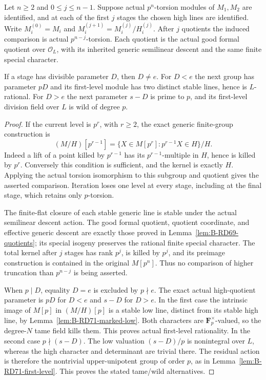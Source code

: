 \begin{lemma}
\label{lem:B-RD74-actual-levels}
Let \(n\ge2\) and \(0\le j\le n-1\). Suppose actual
\(p^n\)-torsion modules of
\(M_1,M_2\) are identified, and at each of the first \(j\)
stages the chosen high lines are identified. Write
\(M_i^{(0)}=M_i\) and
\(M_i^{(j+1)}=M_i^{(j)}/H_i^{(j)}\).
After \(j\) quotients the induced comparison is actual
\(p^{n-j}\)-torsion. Each quotient is the actual good formal
quotient over \(\mathcal O_L\), with its inherited generic
semilinear descent and the same finite special character.

If a stage has divisible parameter \(D\), then \(D\ne e\).
For \(D<e\) the next group has parameter \(pD\) and its
first-level module has two distinct stable lines, hence is
\(L\)-rational. For \(D>e\) the next parameter \(s-D\) is
prime to \(p\), and its first-level division field over \(L\)
is wild of degree \(p\).
\end{lemma}
\begin{proof}
If the current level is \(p^r\), with \(r\ge2\), the exact
generic finite-group construction is
\[
 (M/H)[p^{r-1}]
  =\{X\in M[p^r]:p^{r-1}X\in H\}/H.
 \tag{B-RD74.3}
\]
Indeed a lift of a point killed by \(p^{r-1}\) has its
\(p^{r-1}\)-multiple in \(H\), hence is killed by \(p^r\).
Conversely this condition is sufficient, and the kernel is
exactly \(H\). Applying the actual torsion isomorphism to this
subgroup and quotient gives the asserted comparison. Iteration
loses one level at every stage, including at the final stage,
which retains only \(p\)-torsion.

The finite-flat closure of each stable generic line is stable
under the actual semilinear descent action. The good formal
quotient, quotient coordinate, and effective generic descent
are exactly those proved in
Lemma~\ref{lem:B-RD69-quotients}; its special isogeny preserves
the rational finite special character. The total kernel after
\(j\) stages has rank \(p^j\), is killed by \(p^j\), and its
preimage construction is contained in the original
\(M[p^n]\). Thus no comparison of higher truncation than
\(p^{n-j}\) is being asserted.

When \(p\mid D\), equality \(D=e\) is excluded by \(p\nmid e\).
The exact actual high-quotient parameter is \(pD\) for \(D<e\)
and \(s-D\) for \(D>e\). In the first case the intrinsic
image of \(M[p]\) in \((M/H)[p]\) is a stable low line,
distinct from its stable high line, by
Lemma~\ref{lem:B-RD71-marked-low}. Both characters are
\(\mathbf F_p^\times\)-valued, so the degree-\(N\) tame field
kills them. This proves actual first-level rationality.
In the second case \(p\nmid(s-D)\). The low valuation
\((s-D)/p\) is nonintegral over \(L\), whereas the high
character and determinant are trivial there. The residual
action is therefore the nontrivial upper-unipotent group of
order \(p\), as in Lemma~\ref{lem:B-RD71-first-level}.
This proves the stated tame/wild alternatives.
\end{proof}

